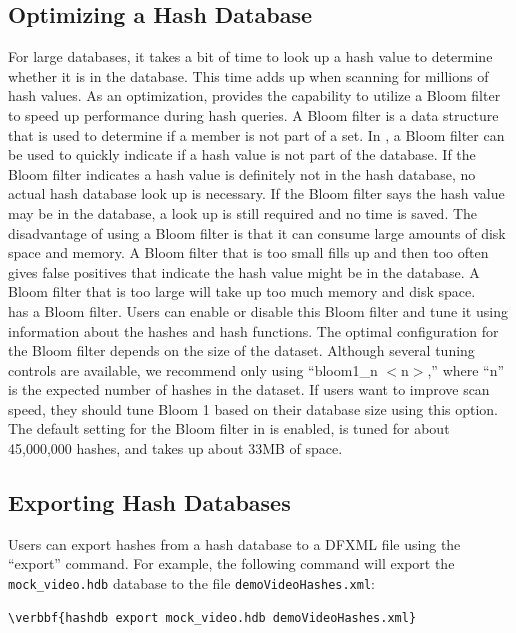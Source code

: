 \documentclass[11pt,fleqn]{article} %
\begin{document}
\subsection{Optimizing a Hash Database}
\label{optimizing}
 
For large databases, it takes a bit of time to look up a hash value to determine whether it is in the database. This time adds up when scanning for millions of hash values. As an optimization, \hash provides the capability to utilize a Bloom filter to speed up performance during hash queries. A Bloom filter is a data structure that is used to determine if a member is not part of a set. In \hash, a Bloom filter can be used to quickly indicate if a hash value is not part of the database. If the Bloom filter indicates a hash value is definitely not in the hash database, no actual hash database look up is necessary. If the Bloom filter says the hash value may be in the database, a look up is still required and no time is saved. The disadvantage of using a Bloom filter is that it can consume large amounts of disk space and memory. A Bloom filter that is too small fills up and then too often gives false positives that indicate the hash value might be in the database. A Bloom filter that is too large will take up too much memory and disk space.\\

\hash has a Bloom filter.  Users can enable or disable this Bloom filter and tune it using information about the hashes and hash functions. The optimal configuration for the Bloom filter depends on the size of the dataset. Although several tuning controls are available, we recommend only using ``bloom1\_n $<$n$>$,'' where ``n'' is the expected number of hashes in the dataset. If users want to improve scan speed, they should tune Bloom 1 based on their database size using this option. The default setting for the Bloom filter in \hash is enabled, is tuned for about 45,000,000 hashes, and takes up about 33MB of space. 

\subsection{Exporting Hash Databases}
Users can export hashes from a hash database to a DFXML file using the ``export'' command. For example, the following command will export the \texttt{mock\_video.hdb} database to the file \texttt{demoVideoHashes.xml}:
\begin{Verbatim}[commandchars=\\\{\}]
\verbbf{hashdb export mock_video.hdb demoVideoHashes.xml}
\end{Verbatim}
\end{document}
